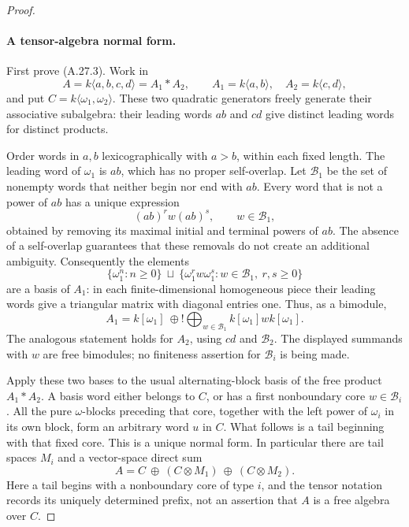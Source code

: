 \begin{proof}
\paragraph{A tensor-algebra normal form.}
First prove (A.27.3). Work in
\[
 A=k\langle a,b,c,d\rangle=A_1*A_2,
 \qquad A_1=k\langle a,b\rangle,
 \quad A_2=k\langle c,d\rangle,
\]
and put $C=k\langle\omega_1,\omega_2\rangle$.
These two quadratic generators freely generate their
associative subalgebra: their leading words $ab$ and $cd$
give distinct leading words for distinct products.

Order words in $a,b$ lexicographically with $a>b$, within
each fixed length. The leading word of $\omega_1$ is $ab$,
which has no proper self-overlap. Let $\mathcal B_1$ be the
set of nonempty words that neither begin nor end with $ab$.
Every word that is not a power of $ab$ has a unique expression
\[
                        (ab)^r w(ab)^s,
 \qquad w\in\mathcal B_1,
\]
obtained by removing its maximal initial and terminal
powers of $ab$. The absence of a self-overlap guarantees
that these removals do not create an additional ambiguity.
Consequently the elements
\[
 \{\omega_1^n:n\ge0\}\ \sqcup\
 \{\omega_1^r w\omega_1^s:
              w\in\mathcal B_1,\ r,s\ge0\}
                                                        \tag{A.27.4}
\]
are a basis of $A_1$: in each finite-dimensional homogeneous
piece their leading words give a triangular matrix with
diagonal entries one. Thus, as a bimodule,
\[
 A_1=k[\omega_1]\ \oplus\!!\bigoplus_{w\in\mathcal B_1}
                          k[\omega_1]w k[\omega_1].
                                                        \tag{A.27.5}
\]
The analogous statement holds for $A_2$, using $cd$ and
$\mathcal B_2$. The displayed summands with $w$ are free
bimodules; no finiteness assertion for $\mathcal B_i$ is
being made.

Apply these two bases to the usual alternating-block
basis of the free product $A_1*A_2$. A basis word either
belongs to $C$, or has a first nonboundary core
$w\in\mathcal B_i$. All the pure $\omega$-blocks preceding
that core, together with the left power of $\omega_i$
in its own block, form an arbitrary word $u$ in $C$.
What follows is a tail beginning with that fixed core.
This is a unique normal form. In particular there are
tail spaces $M_i$ and a vector-space direct sum
\[
                    A=C\ \oplus\ (C\otimes M_1)
                           \ \oplus\ (C\otimes M_2).
                                                        \tag{A.27.6}
\]
Here a tail begins with a nonboundary core of type $i$,
and the tensor notation records its uniquely determined
prefix, not an assertion that $A$ is a free algebra over $C$.


\end{proof}
